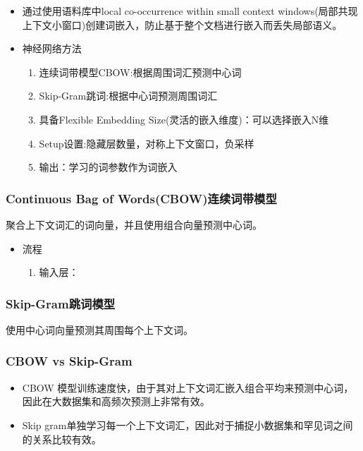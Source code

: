 \documentclass[UTF8]{ctexart}
\begin{document}
\begin{itemize}
    \item 通过使用语料库中local co-occurrence within small context windows(局部共现上下文小窗口)创建词嵌入，防止基于整个文档进行嵌入而丢失局部语义。
    \item 神经网络方法
    \begin{enumerate}
        \item 连续词带模型CBOW:根据周围词汇预测中心词
        \item Skip-Gram跳词:根据中心词预测周围词汇
        \item 具备Flexible Embedding Size(灵活的嵌入维度)：可以选择嵌入N维
        \item Setup设置:隐藏层数量，对称上下文窗口，负采样
        \item 输出：学习的词参数作为词嵌入
    \end{enumerate}
\end{itemize}

\subsubsection{Continuous Bag of Words(CBOW)连续词带模型}

聚合上下文词汇的词向量，并且使用组合向量预测中心词。

\begin{itemize}
    \item 流程
    \begin{enumerate}
        \item 输入层：
    \end{enumerate}
\end{itemize}

\subsubsection{Skip-Gram跳词模型}

使用中心词向量预测其周围每个上下文词。


\subsubsection{CBOW vs Skip-Gram}

\begin{itemize}
    \item CBOW 模型训练速度快，由于其对上下文词汇嵌入组合平均来预测中心词，因此在大数据集和高频次预测上非常有效。
    \item Skip gram单独学习每一个上下文词汇，因此对于捕捉小数据集和罕见词之间的关系比较有效。
\end{itemize}
\end{document}
